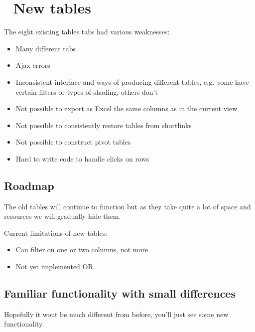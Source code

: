 \documentclass[
]{book}
\providecommand{\tightlist}{%
  \setlength{\itemsep}{0pt}\setlength{\parskip}{0pt}}
\begin{document}
\hypertarget{new-tables}{%
\section{🧪 New tables}\label{new-tables}}

The eight existing tables tabs had various weaknesses:

\begin{itemize}
\item
  Many different tabs
\item
  Ajax errors
\item
  Inconsistent interface and ways of producing different tables, e.g.~some have certain filters or types of shading, others don't
\item
  Not possible to export as Excel the same columns as in the current view
\item
  Not possible to consistently restore tables from shortlinks
\item
  Not possible to construct pivot tables
\item
  Hard to write code to handle clicks on rows
\end{itemize}

\hypertarget{roadmap}{%
\subsection{Roadmap}\label{roadmap}}

The old tables will continue to function but as they take quite a lot of space and resources we will gradually hide them.

Current limitations of new tables:

\begin{itemize}
\tightlist
\item
  Can filter on one or two columns, not more
\item
  Not yet implemented OR
\end{itemize}

\hypertarget{familiar-functionality-with-small-differences}{%
\subsection{Familiar functionality with small differences}\label{familiar-functionality-with-small-differences}}

Hopefully it wont be much different from before, you'll just see some new functionality.
\end{document}
